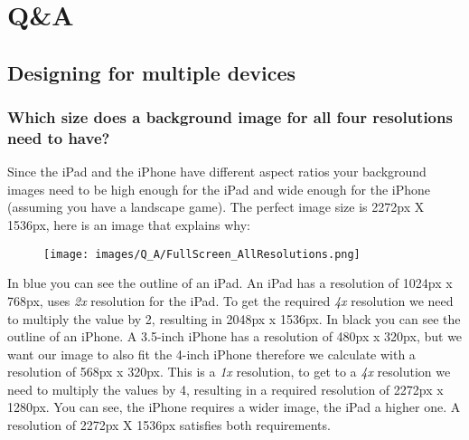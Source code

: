 \chapter{Q\&A}

\section{Designing for multiple devices}

\subsection{Which size does a background image for all four resolutions need to
have?}\label{background_all_resolutions}
Since the iPad and the iPhone have different aspect ratios your
background images need to be high enough for the iPad and wide enough for the
iPhone (assuming you have a landscape game). The perfect image size is 2272px X
1536px, here is an image that explains why:

\begin{figure}[H]
		\centering
		\texttt{[image: images/Q\_A/FullScreen\_AllResolutions.png]}
\end{figure}

In blue you can see the outline of an iPad. An iPad has a resolution of
1024px x 768px, \SB{} uses \textit{2x} resolution for the iPad. To get the
required \textit{4x} resolution we need to multiply the value by 2, resulting in 2048px x 1536px.
In black you can see the outline of an iPhone. A 3.5-inch iPhone has a resolution
of 480px x 320px, but we want our image to also fit the 4-inch iPhone therefore
we calculate with a resolution of 568px x 320px. This is a \textit{1x}
resolution, to get to a \textit{4x} resolution we need to multiply the values by
4, resulting in a required resolution of 2272px x 1280px. You can see, the
iPhone requires a wider image, the iPad a higher one. A resolution of 2272px X
1536px satisfies both requirements. 
